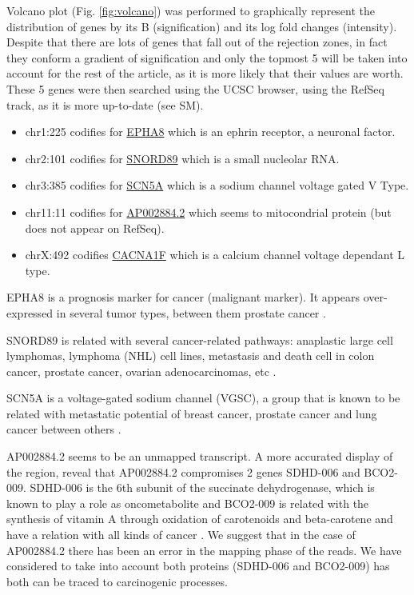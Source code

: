 \documentclass[9pt,twocolumn,twoside]{gsajnl}
\begin{document}
Volcano plot (Fig. \ref{fig:volcano}) was performed to graphically represent the distribution of genes by its B (signification) and its log fold changes (intensity). Despite that there are lots of genes that fall out of the rejection zones, in fact they conform a gradient of signification and only the topmost 5 will be taken into account for the rest of the article, as it is more likely that their values are worth. These 5 genes were then searched using the UCSC browser, using the RefSeq track, as it is more up-to-date (see SM).

\begin{itemize}
\item chr1:225 codifies for \href{http://www.genecards.org/cgi-bin/carddisp.pl?gene=EPHA8}{EPHA8} which is an ephrin receptor, a neuronal factor.
\item chr2:101 codifies for \href{http://www.genecards.org/cgi-bin/carddisp.pl?gene=SNORD89}{SNORD89} which is a small nucleolar RNA.
\item chr3:385 codifies for \href{http://www.genecards.org/cgi-bin/carddisp.pl?gene=SCN5A}{SCN5A} which is a sodium channel voltage gated V Type.
\item chr11:11 codifies for \href{http://www.ensembl.org/Homo_sapiens/Gene/Summary?g=ENSG00000255292;r=11:112086903-112193805}{AP002884.2} which seems to mitocondrial protein (but does not appear on RefSeq).
\item chrX:492 codifies \href{http://www.genecards.org/cgi-bin/carddisp.pl?gene=CACNA1F}{CACNA1F} which is a calcium channel voltage dependant L type.
\end{itemize}

EPHA8 is a prognosis marker for cancer (malignant marker). It appears over-expressed in several tumor types, between them prostate cancer \citep{proteinatlas,uhlen2015tissue}.

SNORD89 is related with several cancer-related pathways:  anaplastic large cell lymphomas, lymphoma (NHL) cell lines, metastasis and death cell in colon cancer, prostate cancer, ovarian adenocarcinomas, etc \citep{tcng}.

SCN5A is a voltage-gated sodium channel (VGSC), a group that is known to be related with metastatic potential of breast cancer, prostate cancer and lung cancer between others \citep{Nelson2015}.

AP002884.2 seems to be an unmapped transcript. A more accurated display of the region, reveal that AP002884.2 compromises 2 genes SDHD-006 and BCO2-009. SDHD-006 is the 6th subunit of the succinate dehydrogenase, which is known to play a role as oncometabolite \cite{oncometabolites} and BCO2-009 is related with the synthesis of vitamin A through oxidation of carotenoids  and beta-carotene and have a relation with all kinds of cancer \citep{proteinatlas,uhlen2015tissue}. We suggest that in the case of AP002884.2 there has been an error in the mapping phase of the reads. We have considered to take into account both proteins (SDHD-006 and BCO2-009) has both can be traced to carcinogenic processes.
\end{document}
